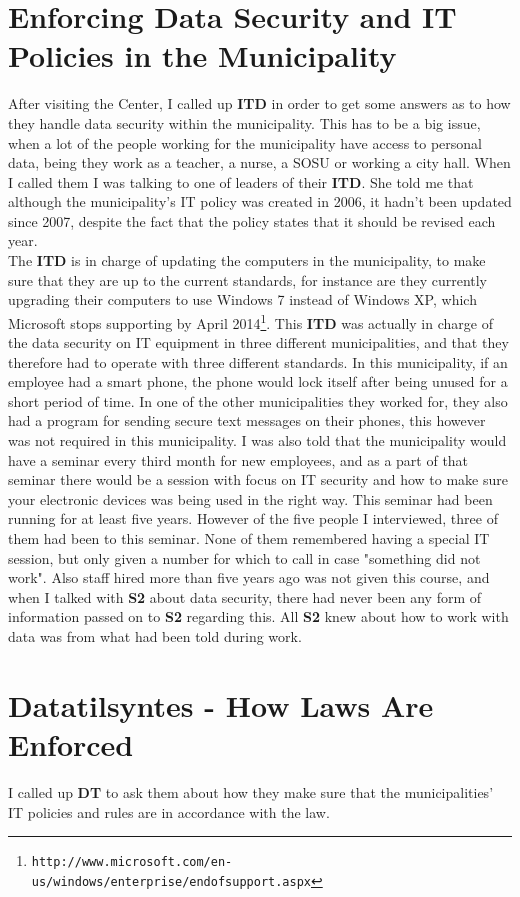 \documentclass[11pt]{article}
\begin{document}
\section{Enforcing Data Security and IT Policies in the Municipality}
After visiting the Center, I called up \textbf{ITD} in order to get some answers as to how they handle data security within the municipality. This has to be a big issue, when a lot of the people working for the municipality have access to personal data, being they work as a teacher, a nurse, a SOSU or working a city hall. 
When I called them I was talking to one of leaders of their \textbf{ITD}. She told me that although the municipality's IT policy was created in 2006, it hadn't been updated since 2007, despite the fact that the policy states that it should be revised each year.\\
The \textbf{ITD} is in charge of updating the computers in the municipality, to make sure that they are up to the current standards, for instance are they currently upgrading their computers to use Windows 7 instead of Windows XP, which Microsoft stops supporting by April 2014\footnote{ \texttt{http://www.microsoft.com/en-us/windows/enterprise/endofsupport.aspx} }.
This \textbf{ITD} was actually in charge of the data security on IT equipment in three different municipalities, and that they therefore had to operate with three different standards. In this municipality, if an employee had a smart phone, the phone would lock itself after being unused for a short period of time. In one of the other municipalities they worked for, they also had a program for sending secure text messages on their phones, this however was not required in this municipality.
I was also told that the municipality would have a seminar every third month for new employees, and as a part of that seminar there would be a session with focus on IT security and how to make sure your electronic devices was being used in the right way. This seminar had been running for at least five years. However of the five people I interviewed, three of them had been to this seminar. None of them remembered having a special IT session, but only given a number for which to call in case "something did not work". Also staff hired more than five years ago was not given this course, and when I talked with \textbf{S2} about data security, there had never been any form of information passed on to \textbf{S2} regarding this. All \textbf{S2} knew about how to work with data was from what had been told during work.

\section{Datatilsyntes - How Laws Are Enforced}
I called up \textbf{DT} to ask them about how they make sure that the municipalities' IT policies and rules are in accordance with the law.
\end{document}
